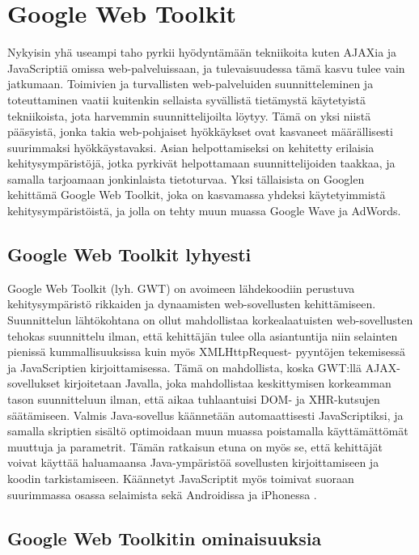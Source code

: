 \section{Google Web Toolkit}

Nykyisin yhä useampi taho pyrkii hyödyntämään tekniikoita kuten AJAXia ja JavaScriptiä omissa web-palveluissaan, ja tulevaisuudessa tämä kasvu tulee vain jatkumaan. Toimivien ja 
turvallisten  web-palveluiden suunnitteleminen ja toteuttaminen vaatii kuitenkin sellaista syvällistä tietämystä käytetyistä tekniikoista, jota harvemmin suunnittelijoilta löytyy. 
Tämä on yksi  niistä pääsyistä, jonka takia web-pohjaiset hyökkäykset ovat kasvaneet määrällisesti suurimmaksi hyökkäystavaksi. Asian helpottamiseksi on kehitetty erilaisia 
kehitysympäristöjä, jotka pyrkivät helpottamaan suunnittelijoiden taakkaa, ja samalla tarjoamaan jonkinlaista tietoturvaa. Yksi tällaisista on Googlen kehittämä Google Web Toolkit, 
joka on kasvamassa yhdeksi käytetyimmistä kehitysympäristöistä, ja jolla on tehty muun muassa Google Wave ja AdWords.

\subsection{Google Web Toolkit lyhyesti}

Google Web Toolkit (lyh. GWT) on avoimeen lähdekoodiin perustuva kehitysympäristö rikkaiden ja dynaamisten web-sovellusten kehittämiseen. Suunnittelun lähtökohtana on ollut mahdollistaa
korkealaatuisten web-sovellusten tehokas suunnittelu ilman, että kehittäjän tulee olla asiantuntija niin selainten pienissä kummallisuuksissa kuin myös XMLHttpRequest- pyyntöjen
tekemisessä ja JavaScriptien kirjoittamisessa. Tämä on mahdollista, koska GWT:llä AJAX-sovellukset kirjoitetaan Javalla, joka mahdollistaa keskittymisen korkeamman tason suunnitteluun 
ilman, että aikaa tuhlaantuisi DOM- ja XHR-kutsujen säätämiseen. Valmis Java-sovellus käännetään automaattisesti JavaScriptiksi, ja samalla skriptien sisältö optimoidaan muun muassa
poistamalla käyttämättömät muuttuja ja parametrit. Tämän ratkaisun etuna on myös se, että kehittäjät voivat käyttää haluamaansa Java-ympäristöä sovellusten kirjoittamiseen ja koodin 
tarkistamiseen. Käännetyt JavaScriptit myös toimivat suoraan suurimmassa osassa selaimista sekä Androidissa ja iPhonessa \cite{GWT}.

\subsection{Google Web Toolkitin ominaisuuksia}

